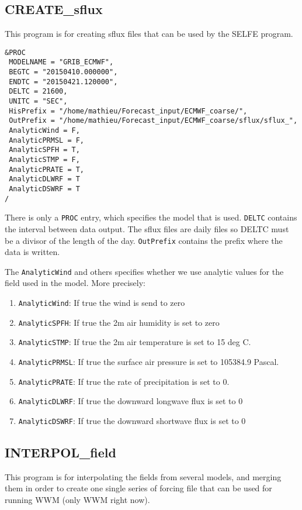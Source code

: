 \documentclass[12pt]{amsart}
\begin{document}
\subsection{CREATE\_sflux}

This program is for creating sflux files that can be used by the SELFE program.
\begin{verbatim}
&PROC
 MODELNAME = "GRIB_ECMWF", 
 BEGTC = "20150410.000000",
 ENDTC = "20150421.120000",
 DELTC = 21600, 
 UNITC = "SEC", 
 HisPrefix = "/home/mathieu/Forecast_input/ECMWF_coarse/", 
 OutPrefix = "/home/mathieu/Forecast_input/ECMWF_coarse/sflux/sflux_", 
 AnalyticWind = F,
 AnalyticPRMSL = F,
 AnalyticSPFH = T,
 AnalyticSTMP = F,
 AnalyticPRATE = T,
 AnalyticDLWRF = T
 AnalyticDSWRF = T
/
\end{verbatim}
There is only a {\tt PROC} entry, which specifies the model that is used. {\tt DELTC} contains the interval between data output. The sflux files are daily files so DELTC must be a divisor of the length of the day.
{\tt OutPrefix} contains the prefix where the data is written.

The {\tt AnalyticWind} and others specifies whether we use analytic values for the field used in the model.
More precisely:
\begin{enumerate}
\item {\tt AnalyticWind}: If true the wind is send to zero
\item {\tt AnalyticSPFH}: If true the 2m air humidity is set to zero
\item {\tt AnalyticSTMP}: If true the 2m air temperature is set to 15 deg C.
\item {\tt AnalyticPRMSL}: If true the surface air pressure is set to 105384.9 Pascal.
\item {\tt AnalyticPRATE}: If true the rate of precipitation is set to 0.
\item {\tt AnalyticDLWRF}: If true the downward longwave flux is set to 0
\item {\tt AnalyticDSWRF}: If true the downward shortwave flux is set to 0
\end{enumerate}



\subsection{INTERPOL\_field}

This program is for interpolating the fields from several models, and merging them in order to
create one single series of forcing file that can be used for running WWM (only WWM right now).
\end{document}
